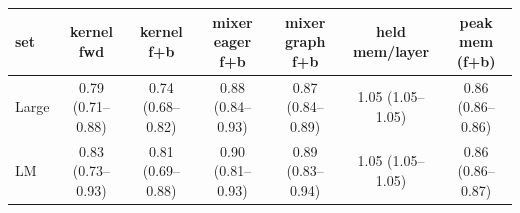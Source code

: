 \begin{tabular}{l c c c c c c }
\toprule
set & kernel fwd & kernel f+b & mixer eager f+b & mixer graph f+b & held mem/layer & peak mem (f+b) \\
\midrule
Large & 0.79 (0.71--0.88) & 0.74 (0.68--0.82) & 0.88 (0.84--0.93) & 0.87 (0.84--0.89) & 1.05 (1.05--1.05) & 0.86 (0.86--0.86) \\
LM & 0.83 (0.73--0.93) & 0.81 (0.69--0.88) & 0.90 (0.81--0.93) & 0.89 (0.83--0.94) & 1.05 (1.05--1.05) & 0.86 (0.86--0.87) \\
\bottomrule
\end{tabular}
